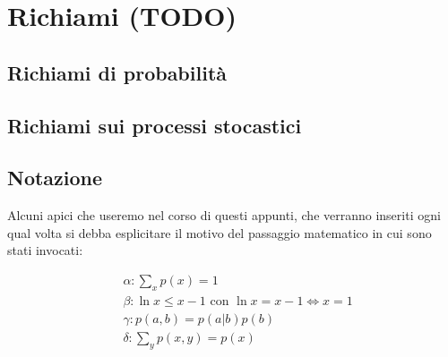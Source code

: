 \section{Richiami (TODO)}
\subsection{Richiami di probabilit\`a}
\label{sec:prob}

\subsection{Richiami sui processi stocastici}
\label{sec:stoc}

\subsection{Notazione}
Alcuni apici che useremo nel corso di questi appunti, che verranno inseriti ogni qual volta si debba esplicitare il motivo del passaggio matematico in cui sono stati invocati:

\begin{align*}
    &\alpha : \sum_{x} p(x) = 1 \\
    &\beta : \ln x \leq x - 1 \text{ con } \ln x = x - 1 \iff x = 1 \\
    &\gamma : p(a,b) = p(a|b)p(b) \\
    &\delta : \sum_{y} p(x,y) = p(x)
\end{align*}